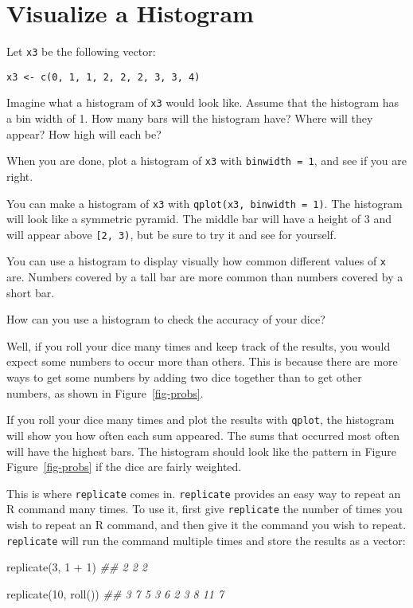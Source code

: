 \documentclass[
  letterpaper,
  DIV=11,
  numbers=noendperiod]{scrbook}
\newenvironment{Shaded}{\begin{snugshade}}{\end{snugshade}}
\newcommand{\DecValTok}[1]{\textcolor[rgb]{0.68,0.00,0.00}{#1}}
\newcommand{\DocumentationTok}[1]{\textcolor[rgb]{0.37,0.37,0.37}{\textit{#1}}}
\newcommand{\FunctionTok}[1]{\textcolor[rgb]{0.28,0.35,0.67}{#1}}
\newcommand{\NormalTok}[1]{\textcolor[rgb]{0.00,0.23,0.31}{#1}}
\newcommand{\SpecialCharTok}[1]{\textcolor[rgb]{0.37,0.37,0.37}{#1}}
\begin{document}
\label{exr:histogram}
\section{Visualize a Histogram}\label{visualize-a-histogram}

Let \texttt{x3} be the following vector:

\texttt{x3\ \textless{}-\ c(0,\ 1,\ 1,\ 2,\ 2,\ 2,\ 3,\ 3,\ 4)}

Imagine what a histogram of \texttt{x3} would look like. Assume that the
histogram has a bin width of 1. How many bars will the histogram have?
Where will they appear? How high will each be?

When you are done, plot a histogram of \texttt{x3} with
\texttt{binwidth\ =\ 1}, and see if you are right.

You can make a histogram of \texttt{x3} with
\texttt{qplot(x3,\ binwidth\ =\ 1)}. The histogram will look like a
symmetric pyramid. The middle bar will have a height of 3 and will
appear above \texttt{{[}2,\ 3)}, but be sure to try it and see for
yourself.

You can use a histogram to display visually how common different values
of \texttt{x} are. Numbers covered by a tall bar are more common than
numbers covered by a short bar.

How can you use a histogram to check the accuracy of your dice?

Well, if you roll your dice many times and keep track of the results,
you would expect some numbers to occur more than others. This is because
there are more ways to get some numbers by adding two dice together than
to get other numbers, as shown in Figure~\ref{fig-probs}.

If you roll your dice many times and plot the results with
\texttt{qplot}, the histogram will show you how often each sum appeared.
The sums that occurred most often will have the highest bars. The
histogram should look like the pattern in Figure Figure~\ref{fig-probs}
if the dice are fairly weighted.

This is where \texttt{replicate} comes in. \texttt{replicate} provides
an easy way to repeat an R command many times. To use it, first give
\texttt{replicate} the number of times you wish to repeat an R command,
and then give it the command you wish to repeat. \texttt{replicate} will
run the command multiple times and store the results as a vector:

\begin{Shaded}
\begin{Highlighting}[]
\FunctionTok{replicate}\NormalTok{(}\DecValTok{3}\NormalTok{, }\DecValTok{1} \SpecialCharTok{+} \DecValTok{1}\NormalTok{)}
\DocumentationTok{\#\# 2 2 2}

\FunctionTok{replicate}\NormalTok{(}\DecValTok{10}\NormalTok{, }\FunctionTok{roll}\NormalTok{())}
\DocumentationTok{\#\# 3  7  5  3  6  2  3  8 11  7}
\end{Highlighting}
\end{Shaded}
\end{document}
